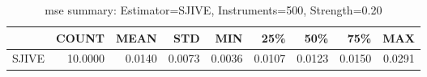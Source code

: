 \begin{table}[ht]
\centering
\caption{mse summary: Estimator=SJIVE, Instruments=500, Strength=0.20}
\begin{tabular}{lrrrrrrrr}
\toprule
 & COUNT & MEAN & STD & MIN & 25\% & 50\% & 75\% & MAX \\
\midrule
SJIVE & 10.0000 & 0.0140 & 0.0073 & 0.0036 & 0.0107 & 0.0123 & 0.0150 & 0.0291 \\
\bottomrule
\end{tabular}
\end{table}
